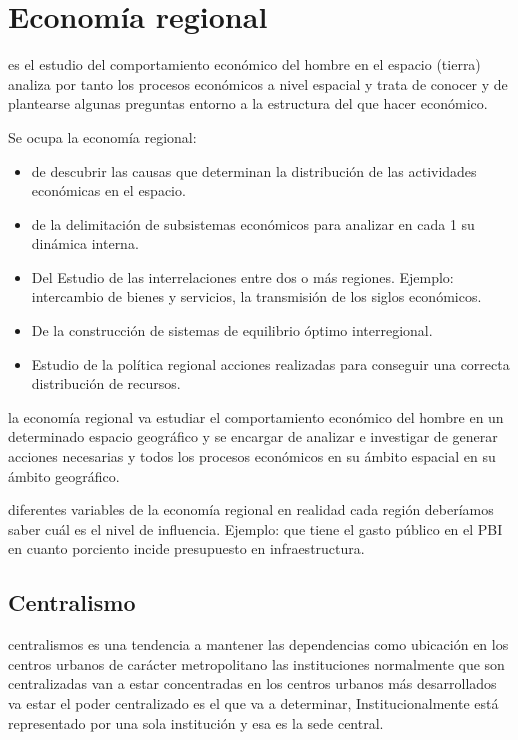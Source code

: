 \documentclass[
  jou,
  floatsintext,
  longtable,
  a4paper,
  nolmodern,
  notxfonts,
  notimes,
  12pt,
  colorlinks=true,linkcolor=blue,citecolor=blue,urlcolor=blue]{apa7}
\providecommand{\tightlist}{%
  \setlength{\itemsep}{0pt}\setlength{\parskip}{0pt}}
\begin{document}
\section{Economía regional}\label{economuxeda-regional}

es el estudio del comportamiento económico del hombre en el espacio
(tierra) analiza por tanto los procesos económicos a nivel espacial y
trata de conocer y de plantearse algunas preguntas entorno a la
estructura del que hacer económico.

Se ocupa la economía regional:

\begin{itemize}
\tightlist
\item
  de descubrir las causas que determinan la distribución de las
  actividades económicas en el espacio.
\item
  de la delimitación de subsistemas económicos para analizar en cada 1
  su dinámica interna.
\item
  Del Estudio de las interrelaciones entre dos o más regiones. Ejemplo:
  intercambio de bienes y servicios, la transmisión de los siglos
  económicos.
\item
  De la construcción de sistemas de equilibrio óptimo interregional.
\item
  Estudio de la política regional acciones realizadas para conseguir una
  correcta distribución de recursos.
\end{itemize}

la economía regional va estudiar el comportamiento económico del hombre
en un determinado espacio geográfico y se encargar de analizar e
investigar de generar acciones necesarias y todos los procesos
económicos en su ámbito espacial en su ámbito geográfico.

diferentes variables de la economía regional en realidad cada región
deberíamos saber cuál es el nivel de influencia. Ejemplo: que tiene el
gasto público en el PBI en cuanto porciento incide presupuesto en
infraestructura.

\subsection{Centralismo}\label{centralismo}

centralismos es una tendencia a mantener las dependencias como ubicación
en los centros urbanos de carácter metropolitano las instituciones
normalmente que son centralizadas van a estar concentradas en los
centros urbanos más desarrollados va estar el poder centralizado es el
que va a determinar, Institucionalmente está representado por una sola
institución y esa es la sede central.
\end{document}
